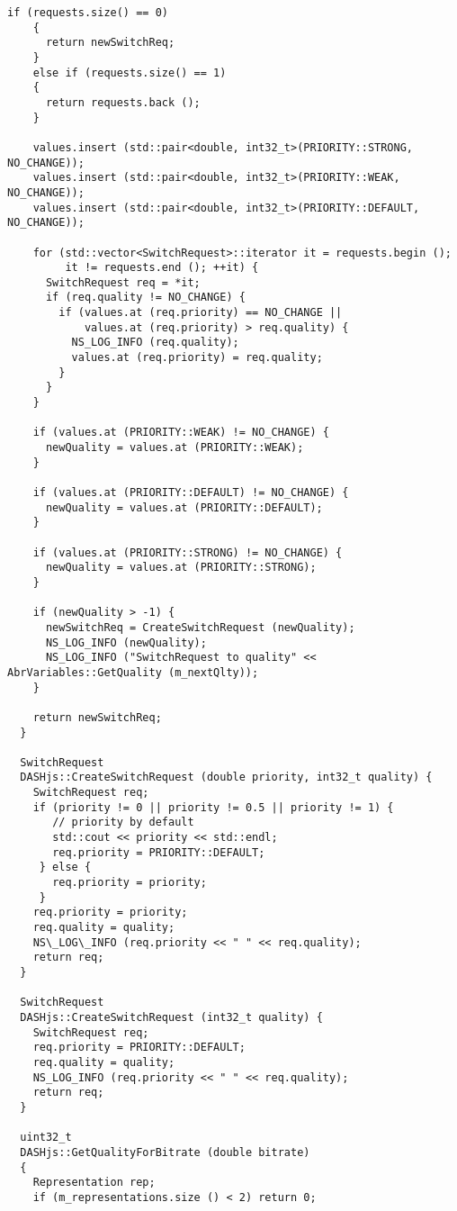 \begin{lstlisting}[language=myC++, caption={DASHjs.cc}, captionpos=b]
    if (requests.size() == 0)
    {
      return newSwitchReq;
    }
    else if (requests.size() == 1)
    {
      return requests.back ();
    }
  
    values.insert (std::pair<double, int32_t>(PRIORITY::STRONG, NO_CHANGE));
    values.insert (std::pair<double, int32_t>(PRIORITY::WEAK, NO_CHANGE));
    values.insert (std::pair<double, int32_t>(PRIORITY::DEFAULT, NO_CHANGE));
  
    for (std::vector<SwitchRequest>::iterator it = requests.begin ();
         it != requests.end (); ++it) {
      SwitchRequest req = *it;
      if (req.quality != NO_CHANGE) {
        if (values.at (req.priority) == NO_CHANGE ||
            values.at (req.priority) > req.quality) {
          NS_LOG_INFO (req.quality);
          values.at (req.priority) = req.quality;
        }
      }
    }
  
    if (values.at (PRIORITY::WEAK) != NO_CHANGE) {
      newQuality = values.at (PRIORITY::WEAK);
    }
  
    if (values.at (PRIORITY::DEFAULT) != NO_CHANGE) {
      newQuality = values.at (PRIORITY::DEFAULT);
    }
  
    if (values.at (PRIORITY::STRONG) != NO_CHANGE) {
      newQuality = values.at (PRIORITY::STRONG);
    }
  
    if (newQuality > -1) {
      newSwitchReq = CreateSwitchRequest (newQuality);
      NS_LOG_INFO (newQuality);
      NS_LOG_INFO ("SwitchRequest to quality" << AbrVariables::GetQuality (m_nextQlty));
    }
  
    return newSwitchReq;
  }
  
  SwitchRequest
  DASHjs::CreateSwitchRequest (double priority, int32_t quality) {
    SwitchRequest req;
    if (priority != 0 || priority != 0.5 || priority != 1) {
       // priority by default
       std::cout << priority << std::endl;
       req.priority = PRIORITY::DEFAULT;
     } else {
       req.priority = priority;
     }
    req.priority = priority;
    req.quality = quality;
    NS\_LOG\_INFO (req.priority << " " << req.quality);
    return req;
  }
  
  SwitchRequest
  DASHjs::CreateSwitchRequest (int32_t quality) {
    SwitchRequest req;
    req.priority = PRIORITY::DEFAULT;
    req.quality = quality;
    NS_LOG_INFO (req.priority << " " << req.quality);
    return req;
  }
  
  uint32_t
  DASHjs::GetQualityForBitrate (double bitrate)
  {
    Representation rep;
    if (m_representations.size () < 2) return 0;
  

\end{lstlisting}
